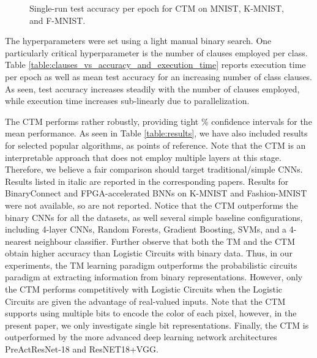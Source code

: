 \documentclass{article}
\begin{document}
\begin{figure}[ht]
\centering
{}
\caption{Single-run test accuracy per epoch for CTM on MNIST, K-MNIST, and F-MNIST.}
\label{figure:accuracy_per_epoch}
\end{figure}

 The hyperparameters were set using a light manual binary search. One particularly critical hyperparameter is the number of clauses employed per class. Table \ref{table:clauses_vs_accuracy_and_execution_time} reports execution time per epoch as well as mean test accuracy for an increasing number of class clauses. As seen, test accuracy increases steadily with the number of clauses employed, while execution time increases sub-linearly due to parallelization.
 
  The CTM performs rather robustly, providing tight \% confidence intervals for the mean performance. As seen in Table  \ref{table:results}, we have also included results for selected popular algorithms, as points of reference. Note that the CTM is an interpretable approach that does not employ multiple layers at this stage. Therefore, we believe a fair comparison should target traditional/simple CNNs. Results listed in italic are reported in the corresponding papers. Results for BinaryConnect and FPGA-accelerated BNNs on K-MNIST and Fashion-MNIST were not available, so are not reported. Notice that the CTM outperforms the binary CNNs for all the datasets, as well several simple baseline configurations, including 4-layer CNNs, Random Forests, Gradient Boosting, SVMs, and a 4-nearest neighbour classifier. Further observe that both the TM and the CTM obtain higher accuracy than Logistic Circuits \cite{LiangAAAI19} with binary data. Thus, in our experiments, the TM learning paradigm outperforms the probabilistic circuits paradigm \cite{LiangAAAI19,Peharzetal18} at extracting information from binary representations. However, only the CTM performs competitively with Logistic Circuits when the Logistic Circuits are given the advantage of real-valued inputs. Note that the CTM supports using multiple bits to encode the color of each pixel, however, in the present paper, we only investigate single bit representations. Finally, the CTM is outperformed by the more advanced deep learning network architectures PreActResNet-18 and ResNET18+VGG.
  
\end{document}
